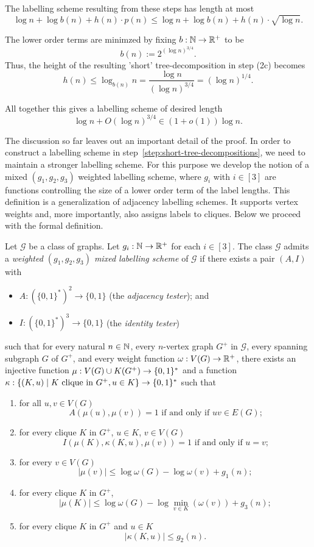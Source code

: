 \documentclass{patmorin}
\renewcommand{\le}{\leqslant}
\renewcommand{\leq}{\leqslant}
\newcommand{\defin}[1]{\emph{\textcolor{brightmaroon}{#1}}}
\DeclarePairedDelimiter{\set}{\{}{\}}
\newcommand{\calG}{\mathcal{G}}
\begin{document}
The labelling scheme resulting from these steps has length at most $$\log n +\log b(n) + h(n)\cdot p(n) \leq \log n +\log b(n) + h(n)\cdot \sqrt{\log n}.$$

The lower order terms are minimzed by fixing $b:\mathbb{N}\to\mathbb{R}^+$ to be
\[
b(n):= 2^{(\log n)^{3/4}}.
\]
Thus, the height of the resulting 'short' tree-decomposition in step (2c) becomes
\[
h(n) \leq \log_{b(n)}n = \frac{\log n}{(\log n)^{3/4}} = (\log n)^{1/4}.
\]

All together this gives a labelling scheme of desired length $$\log n + O(\log n)^{3/4}\in (1 + o(1))\log n.$$

The discussion so far leaves out an important detail of the proof. In order to construct a labelling scheme in step~\ref{step:short-tree-decompositions},
we need to maintain a stronger labelling scheme.
For this purpose we develop the notion of a mixed $(g_1,g_2,g_3)$ weighted labelling scheme, where $g_i$ with $i\in[3]$ are functions controlling the size of a lower order term of the label lengths.
This definition is a generalization of adjacency labelling schemes.
It supports vertex weights and, more importantly, also assigns labels to cliques. Below we proceed with the formal definition.

Let $\calG$ be a class of graphs.
Let $g_i:\mathbb{N}\to\mathbb{R}^+$ for each $i\in[3]$.
The class  $\calG$ admits a \defin{weighted $(g_1,g_2,g_3)$ mixed labelling scheme} of $\calG$ if there exists a pair $(A,I)$ with
\begin{itemize}[nosep,nolistsep]
     \item $A:(\{0,1\}^*)^2\to\{0,1\}$ (the \defin{adjacency tester}); and
     \item $I:(\{0,1\}^*)^3\to\{0,1\}$ (the \defin{identity tester})
\end{itemize}
such that
for every natural $n\in\mathbb{N}$,
every $n$-vertex graph $G^+$ in $\calG$,
every spanning subgraph $G$ of $G^+$, and
every weight function $\omega:V(G)\to \mathbb{R}^+$,
there exists an injective function $\mu: V(G)\cup K(G^+) \to \set{0,1}^*$ and a function $\kappa:\{(K, u)\mid \textrm{$K$ clique in $G^+$}, u\in K\}\to \set{0,1}^*$
such that
\begin{enumerate}[nosep,nolistsep,label=(\roman*)]
    \item for all $u,v\in V(G)$
    \[
    \textrm{$A(\mu(u),\mu(v))=1$ if and only if $uv\in E(G)$;}
    \]
    \item for every clique $K$ in $G^+$, $u\in K$, $v\in V(G)$
    \[
    \textrm{$I(\mu(K),\kappa(K, u),\mu(v))=1$ if and only if $u=v$;}
    \]
    \item for every $v\in V(G)$
    \[
    |\mu(v)| \leq \log \omega(G) - \log\omega(v) + g_1(n); 
    \]   
    \item for every clique $K$ in $G^+$,
    \[
    |\mu(K)|\le \log \omega(G) - \log\min_{v\in K}(\omega(v)) + g_3(n);
    \]
    \item  for every clique $K$ in $G^+$ and $u\in K$
    \[
    |\kappa(K, u)| \leq g_2(n).
    \]
\end{enumerate}
\end{document}
